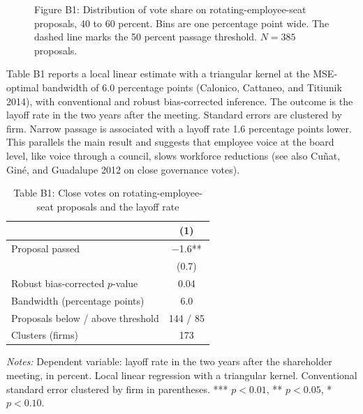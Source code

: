 \documentclass[12pt]{article}
\begin{document}
\begin{figure}[htbp]
\centering
{}
\caption*{Figure B1: Distribution of vote share on rotating-employee-seat proposals, 40 to 60 percent. Bins are one percentage point wide. The dashed line marks the 50 percent passage threshold. $N = 385$ proposals.}
\end{figure}

Table B1 reports a local linear estimate with a triangular kernel at the MSE-optimal bandwidth of 6.0 percentage points (Calonico, Cattaneo, and Titiunik 2014), with conventional and robust bias-corrected inference. The outcome is the layoff rate in the two years after the meeting. Standard errors are clustered by firm. Narrow passage is associated with a layoff rate 1.6 percentage points lower. This parallels the main result and suggests that employee voice at the board level, like voice through a council, slows workforce reductions (see also Cu\~nat, Gin\'e, and Guadalupe 2012 on close governance votes).

\begin{table}[htbp]
\centering
\begin{threeparttable}
\caption*{Table B1: Close votes on rotating-employee-seat proposals and the layoff rate}
\begin{tabular}{lc}
\toprule
 & (1) \\
\midrule
Proposal passed & $-$1.6** \\
 & (0.7) \\
Robust bias-corrected $p$-value & 0.04 \\
\midrule
Bandwidth (percentage points) & 6.0 \\
Proposals below / above threshold & 144 / 85 \\
Clusters (firms) & 173 \\
\bottomrule
\end{tabular}
\begin{tablenotes}\footnotesize
\item \emph{Notes:} Dependent variable: layoff rate in the two years after the shareholder meeting, in percent. Local linear regression with a triangular kernel. Conventional standard error clustered by firm in parentheses. *** $p<0.01$, ** $p<0.05$, * $p<0.10$.
\end{tablenotes}
\end{threeparttable}
\end{table}
\end{document}
